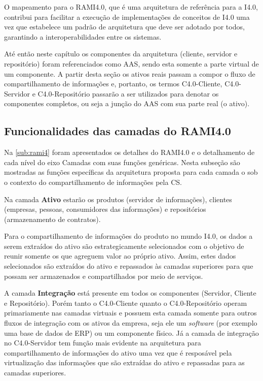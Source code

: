 O mapeamento para o RAMI4.0, que é uma arquitetura de referência para a I4.0, contribui para facilitar a execução de implementações de conceitos de I4.0 uma vez que estabelece um padrão de arquitetura que deve ser adotado por todos, garantindo a interoperabilidades entre os sistemas.

Até então neste capítulo os componentes da arquitetura (cliente, servidor e repositório) foram referenciados como AAS, sendo esta somente a parte virtual de um componente. A partir desta seção os ativos reais passam a compor o fluxo de compartilhamento de informações e, portanto, os termos C4.0-Cliente, C4.0-Servidor e C4.0-Repositório passarão a ser utilizados para denotar os componentes completos, ou seja a junção do AAS com sua parte real (o ativo).

\subsection{Funcionalidades das camadas do RAMI4.0}

Na \autoref{sub:rami4} foram apresentados os detalhes do RAMI4.0 e o detalhamento de cada nível do eixo Camadas com suas funções genéricas. Nesta subseção são mostradas as funções específicas da arquitetura proposta para cada camada o sob o contexto do compartilhamento de informações pela CS.

Na camada \textbf{Ativo} estarão os produtos (servidor de informações), clientes (empresas, pessoas, consumidores das informações) e repositórios (armazenamento de contratos).

Para o compartilhamento de informações do produto no mundo I4.0, os dados a serem extraídos do ativo são estrategicamente selecionados com o objetivo de reunir somente os que agreguem valor ao próprio ativo. Assim, estes dados selecionados são extraídos do ativo e repassados às camadas superiores para que possam ser armazenados e compartilhados por meio de serviços.

A camada \textbf{Integração} está presente em todos os componentes (Servidor, Cliente e Repositório). Porém tanto o C4.0-Cliente quanto o C4.0-Repositório operam primariamente nas camadas virtuais e possuem esta camada somente para outros fluxos de integração com os ativos da empresa, seja ele um \textit{software} (por exemplo uma base de dados de ERP) ou um componente físico. Já a camada de integração no C4.0-Servidor tem função mais evidente na arquitetura para compartilhamento de informações do ativo uma vez que é resposável pela virtualização das informações que são extraídas do ativo e repassadas para as camadas superiores.

